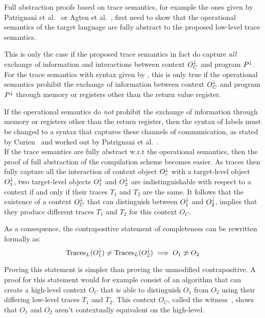 Full abstraction proofs based on trace semantics, for example the ones given by Patrignani et al.~\cite{Patrignani,Patrignani:TraceSemantics} or Agten et al.~\cite{Agten:2012:SCM:2354412.2355247}, first need to show that the operational semantics of the target language are fully abstract to the proposed low-level trace semantics.

This is only the case if the proposed trace semantics in fact do capture \emph{all} exchange of information and interactions between context $O_C^{\downarrow}$ and program $P^{\downarrow}$.
For the trace semantics with syntax given by , this is only true if the operational semantics prohibit the exchange of information between context $O_C^{\downarrow}$ and program $P^{\downarrow}$ through memory or registers other than the return value register.

If the operational semantics do \emph{not} prohibit the exchange of information through memory or registers other than the return register, then the syntax of labels must be changed to a syntax that captures these channels of communication, as stated by Curien~\cite{Curien2007301} and worked out by Patrignani et al.~\cite{Patrignani:TraceSemantics}.
\\[1em]
If the trace semantics are fully abstract w.r.t the operational semantics, then the proof of full abstraction of the compilation scheme becomes easier.
As traces then fully capture all the interaction of context object $O_{c}^{\downarrow}$ with a target-level object $O_{1}^{\downarrow}$, two target-level objects $O_1^{\downarrow}$ and $O_2^{\downarrow}$ are indistinguishable with respect to a context if and only if their traces $T_1$ and $T_2$ are the same.
It follows that the existence of a context $O_C^{\downarrow}$ that can distinguish between $O_1^{\downarrow}$ and $O_2^{\downarrow}$, implies that they produce different traces $T_1$ and $T_2$ for this context $O_C$.

As a consequence, the contrapositive statement of completeness can be rewritten formally as:
\[
     \text{Traces}_L(O_1^{\downarrow}) \neq  \text{Traces}_L(O_2^{\downarrow}) \implies O_{1} \not\simeq O_{2}
\]

Proving this statement is simpler than proving the unmodified contrapositive.
A proof for this statement would for example consist of an algorithm that can create a high-level context $O_C$ that is able to distinguish $O_1$ from $O_2$ using their differing low-level traces $T_1$ and $T_2$.
This context $O_C$, called the witness~\cite{Patrignani}, shows that $O_1$ and $O_2$ aren't contextually equivalent on the high-level.

